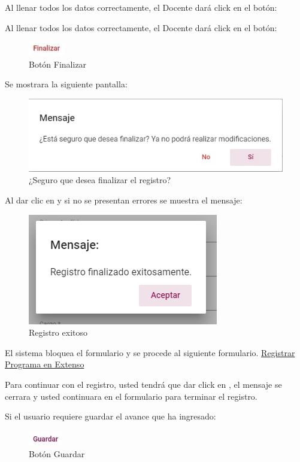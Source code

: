 \documentclass[10pt]{book}
\begin{document}
Al llenar todos los datos correctamente, el Docente dará click en el botón:

Al llenar todos los datos correctamente, el Docente dará click en el botón:

\begin{figure}[!hbtp]
    \centering
    \includegraphics[width=0.1\linewidth]{images/SP6/BotonFinalizar.jpeg}
    \caption{Botón Finalizar} 
\end{figure}

Se mostrara la siguiente pantalla:

\begin{figure}[!hbtp]
    \centering
    \includegraphics[width=0.1\linewidth]{images/SP6/DeseaRegistro.jpeg}
    \caption{¿Seguro que desea finalizar el registro?} 
\end{figure}

Al dar clic en  y si no se presentan errores se muestra el mensaje:


\begin{figure}[!hbtp]
    \centering
    \includegraphics[width=0.4\linewidth]{images/SP6/MSG5.png}
    \caption{Registro exitoso}
    \label{mensaje5}
\end{figure}


El sistema bloquea el formulario y se procede al siguiente formulario. \hyperlink{RPE}{Registrar Programa en Extenso}


Para continuar con el registro, usted tendrá que  dar click en , el mensaje se cerrara y usted continuara 
en el formulario para terminar el registro.

\pagebreak
Si el usuario requiere guardar el avance que ha ingresado: 

\begin{figure}[!hbtp]
    \centering
    \includegraphics[width=0.1\linewidth]{images/SP6/BotonGuardar.jpeg}
    \caption{Botón Guardar} 
\end{figure}
\end{document}
